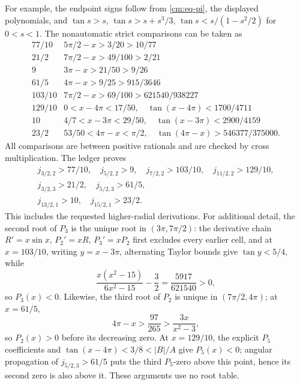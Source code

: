\documentclass[11pt]{article}
\numberwithin{equation}{section}
\theoremstyle{definition}
\theoremstyle{remark}
\begin{document}
For example, the endpoint signs follow from \eqref{cm:eq-pi}, the displayed
polynomials, and
\(\tan s>s\), \(\tan s>s+s^3/3\),
\(\tan s<s/(1-s^2/2)\) for \(0<s<1\).  The nonautomatic strict
comparisons can be taken as
\[
\begin{array}{c|c}
77/10&5\pi/2-x>3/20>10/77\\
21/2&7\pi/2-x>49/100>2/21\\
9&3\pi-x>21/50>9/26\\
61/5&4\pi-x>9/25>915/3646\\
103/10&7\pi/2-x>69/100>621540/938227\\
129/10&0<x-4\pi<17/50,\quad\tan(x-4\pi)<1700/4711\\
10&4/7<x-3\pi<29/50,\quad\tan(x-3\pi)<2900/4159\\
23/2&53/50<4\pi-x<\pi/2,\quad
\tan(4\pi-x)>546377/375000.
\end{array}
\]
All comparisons are between positive rationals and are checked by cross
multiplication.  The ledger proves
\begin{equation}
\begin{gathered}
 j_{3/2,2}>77/10,\quad j_{5/2,2}>9,\quad
 j_{7/2,2}>103/10,\quad j_{11/2,2}>129/10,\\
 j_{3/2,3}>21/2,\quad j_{5/2,3}>61/5,\\
 j_{13/2,1}>10,\quad j_{15/2,1}>23/2.
\end{gathered}
 \label{cm:eq-internal-zero-registry}
\end{equation}
This includes the requested higher-radial derivations.  For additional
detail, the second root of \(P_3\) is the unique root in
\((3\pi,7\pi/2)\): the derivative chain
\(R'=x\sin x\), \(P_2'=xR\), \(P_3'=xP_2\) first excludes every
earlier cell, and at \(x=103/10\), writing \(y=x-3\pi\), alternating
Taylor bounds give \(\tan y<5/4\), while
\[
 \frac{x(x^2-15)}{6x^2-15}-\frac32=\frac{5917}{621540}>0,
\]
so \(P_3(x)<0\).  Likewise, the third root of \(P_2\) is unique in
\((7\pi/2,4\pi)\); at \(x=61/5\),
\[
 4\pi-x>\frac{97}{265}>
 \frac{3x}{x^2-3},
\]
so \(P_2(x)>0\) before its decreasing zero.  At \(x=129/10\), the
explicit \(P_5\) coefficients and
\(\tan(x-4\pi)<3/8<|B|/A\) give \(P_5(x)<0\); angular propagation of
\(j_{5/2,3}>61/5\) puts the third \(P_5\)-zero above this point, hence
its second zero is also above it.  These arguments use no root table.
\end{document}
